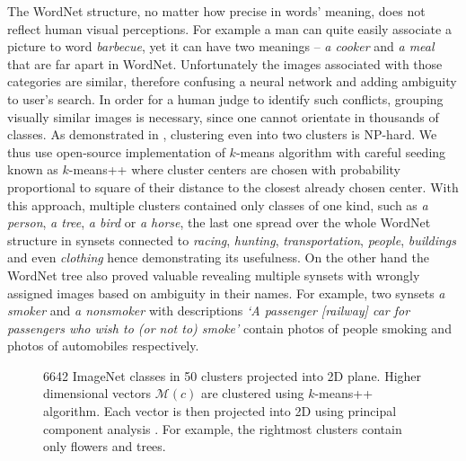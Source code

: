 The WordNet structure, no matter how precise in words' meaning, does not reflect human visual perceptions. For example a man can quite easily associate a picture to word \textit{barbecue}, yet it can have two meanings -- \textit{a cooker} and \textit{a meal} that are far apart in WordNet. Unfortunately the images associated with those categories are similar, therefore confusing a neural network and adding ambiguity to user's search. In order for a human judge to identify such conflicts, grouping visually similar images is necessary, since one cannot orientate in thousands of classes. As demonstrated in \cite{dasgupta2008hardnessKmeans}, clustering even into two clusters is NP-hard. We thus use open-source implementation \cite{scikit-learn} of $k$-means algorithm with careful seeding known as $k$-means++ \cite{kmeans} where cluster centers are chosen with probability proportional to square of their distance to the closest already chosen center. With this approach, multiple clusters contained only classes of one kind, such as \textit{a person}, \textit{a tree}, \textit{a bird} or \textit{a horse}, the last one spread over the whole WordNet structure in synsets connected to \textit{racing}, \textit{hunting}, \textit{transportation}, \textit{people}, \textit{buildings} and even \textit{clothing} hence demonstrating its usefulness. On the other hand the WordNet tree also proved valuable revealing multiple synsets with wrongly assigned images based on ambiguity in their names. For example, two synsets \textit{a smoker} and \textit{a nonsmoker} with descriptions \textit{`A passenger [railway] car for passengers who wish to (or not to) smoke'} contain photos of people smoking and photos of automobiles respectively.


\begin{figure}
	\centering
	\scalebox{0.8}{}
	\caption[Projection of ImageNet classes into 2D]{6642 ImageNet classes in 50 clusters projected into 2D plane. Higher dimensional vectors $\mathcal{M}(c)$ are clustered using $k$-means++ \cite{kmeans} algorithm. Each vector is then projected into 2D using principal component analysis \cite{pca}. For example, the rightmost clusters contain only flowers and trees.}
	\label{fig:dataset_clusters}
\end{figure}

